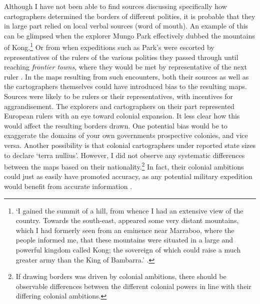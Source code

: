 \documentclass[12pt]{article}
\begin{document}
Although I have not been able to find sources discussing specifically how
cartographers determined the borders of different polities, it is probable that
they in large part relied on local verbal sources (word of mouth). An example of
this can be glimpsed when the explorer Mungo Park effectively dubbed the
mountains of Kong.\footnote{`I gained the summit of a hill, from whence I had an
	extensive view of the country. Towards the south-east, appeared some
	very distant mountains, which I had formerly seen from an eminence near
	Marraboo, where the people informed me, that these mountains were
	situated in a large and powerful kingdom called Kong; the sovereign of
	which could raise a much greater army than the King of Bambarra.'
\citep[CHAPTER XVIII]{ParkMungo2015Titi}.} Or from when expeditions such as
Park's were escorted by representatives of the rulers of the various polities
they passed through until reaching \textit{frontier towns}, where they would be
met by representative of the next ruler \citep{ParkMungo2015Titi}. In the maps
resulting from such encounters, both their sources as well as the cartographers
themselves could have introduced bias to the resulting maps. Sources were likely
to be rulers or their representatives, with incentives for aggrandisement. The
explorers and cartographers on their part represented European rulers with an
eye toward colonial expansion. It less clear how this would affect the resulting
borders drawn. One potential bias would be to exaggerate the domains of your own
governments prospective colonies, and vice versa. Another possibility is that
colonial cartographers under reported state sizes to declare `terra nullius'.
However, I did not observe any systematic differences between the maps based on
their nationality.\footnote{If drawing borders was driven by colonial ambitions,
	there should be observable differences between the different colonial
powers in line with their differing colonial ambitions.} In fact, their colonial
ambitions could just as easily have promoted accuracy, as any potential military
expedition would benefit from accurate information \citep{Bassett_1994}.
\end{document}
